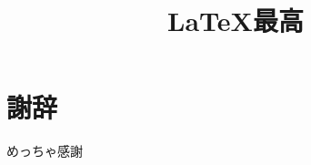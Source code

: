\documentclass[a4jsme, fleqn]{jsmepaper}
\title{\LaTeX 最高}
\def\biblio{\def\newblock{\hskip .11em plus .33em minus .07em}\renewcommand{\refname}{文献}\nocite{*}}
\begin{document}
\def\biblio{}
\maketitle
\thispagestyle{empty}

\thispagestyle{fancy}







\clearpage





\def\newblock{\hskip .11em plus .33em minus .07em}
\renewcommand{\refname}{文献}
\nocite{*}




\section*{{謝辞}}
めっちゃ感謝
\vspace{1cm} 
\end{document}
